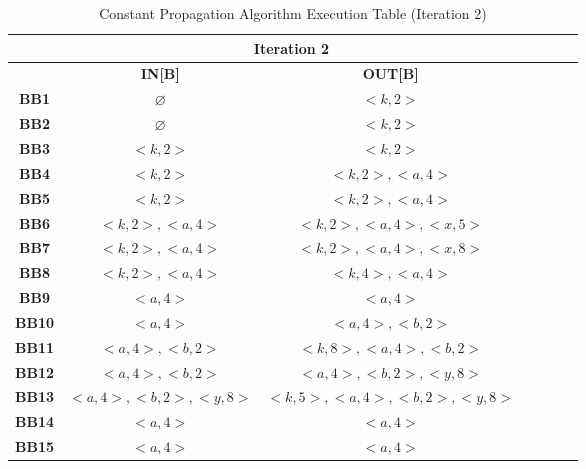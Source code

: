 \documentclass{article}
\begin{document}
\begin{table}[H]
	\centering
	\begin{tabular}{|c|c|c|c|c|c|c|}
		\hline
		              & \multicolumn{2}{c|}{\textbf{Iteration 2}}                                 \\ \hline
		              & \textbf{IN[B]}                            & \textbf{OUT[B]}               \\ \hline
		\textbf{BB1}  & $\varnothing$                             & $<k,2>$                       \\ \hline
		\textbf{BB2}  & $\varnothing$                             & $<k,2>$                       \\ \hline
		\textbf{BB3}  & $<k,2>$                                   & $<k,2>$                       \\ \hline
		\textbf{BB4}  & $<k,2>$                                   & $<k,2>, <a, 4>$               \\ \hline
		\textbf{BB5}  & $<k,2>$                                   & $<k,2>, <a, 4>$               \\ \hline
		\textbf{BB6}  & $<k,2>, <a, 4>$                           & $<k,2>, <a, 4>, <x, 5>$       \\ \hline
		\textbf{BB7}  & $<k,2>, <a, 4>$                           & $<k,2>, <a, 4>, <x, 8>$       \\ \hline
		\textbf{BB8}  & $<k,2>, <a, 4>$                           & $<k,4>, <a, 4>$               \\ \hline
		\textbf{BB9}  & $<a, 4>$                                  & $<a, 4>$                      \\ \hline
		\textbf{BB10} & $ <a, 4>$                                 & $<a, 4>, <b,2>$               \\ \hline
		\textbf{BB11} & $ <a, 4>, <b,2>$                          & $<k,8>, <a, 4>, <b,2>$        \\ \hline
		\textbf{BB12} & $<a, 4>, <b,2>$                           & $<a, 4>, <b,2>, <y,8>$        \\ \hline
		\textbf{BB13} & $<a, 4>, <b,2>, <y,8>$                    & $<k,5>, <a, 4>, <b,2>, <y,8>$ \\ \hline
		\textbf{BB14} & $ <a, 4>$                                 & $<a, 4>$                      \\ \hline
		\textbf{BB15} & $ <a, 4>$                                 & $<a, 4>$                      \\ \hline
	\end{tabular}
	\caption{Constant Propagation Algorithm Execution Table (Iteration 2)}
\end{table}
\end{document}
